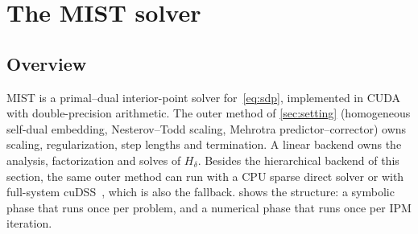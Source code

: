 \section{The MIST solver}\label{sec:algorithm}

\subsection{Overview}

MIST is a primal--dual interior-point solver for~\eqref{eq:sdp}, implemented in
CUDA with double-precision arithmetic. The outer method of \cref{sec:setting}
(homogeneous self-dual embedding, Nesterov--Todd scaling, Mehrotra
predictor--corrector) owns scaling, regularization, step lengths and termination.
A linear backend owns the analysis, factorization and solves of $H_\delta$. Besides
the hierarchical backend of this section, the same outer method can run with a CPU
sparse direct solver or with full-system cuDSS~\cite{cudss}, which is also the
fallback.  shows the structure: a symbolic phase that runs once
per problem, and a numerical phase that runs once per IPM iteration.


